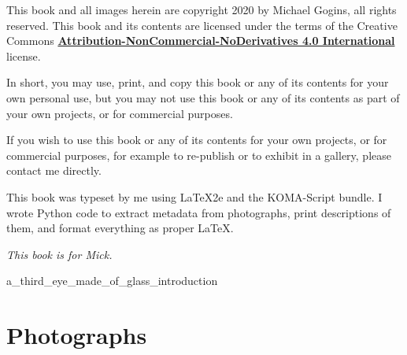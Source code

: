 \clearpage
\thispagestyle{empty}
\noindent This book and all images herein are copyright 2020 by Michael Gogins, all rights reserved. This book and its contents are licensed under the terms of the Creative Commons \href{https://creativecommons.org/licenses/by-nc-nd/4.0/legalcode}{\textbf{Attribution-NonCommercial-NoDerivatives 4.0 International} } license. 

In short, you may use, print, and copy this book or any of its contents for your own personal use, but you may not use this book or any of its contents as part of your own projects, or for commercial purposes.

If you wish to use this book or any of its contents for your own projects, or for commercial purposes, for example to re-publish or to exhibit in a gallery, please contact me directly.

This book was typeset by me using LaTeX2e and the KOMA-Script bundle. I wrote Python code to extract metadata from photographs, print descriptions of them, and format everything as proper LaTeX.

\clearpage
\thispagestyle{empty}
\begin{center}
\emph{This book is for Mick.}
\end{center}

\clearpage
\tableofcontents

\mainmatter
{}

\setlength{\columnsep}{3em}
\twocolumn

 {a_third_eye_made_of_glass_introduction}	
	
\onecolumn
\chapter{Photographs}
\clearpage

